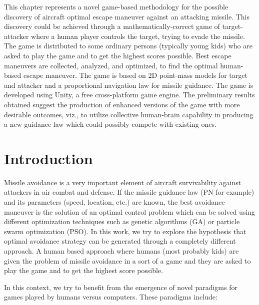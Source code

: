 \label{game}

This chapter represents a novel game-based methodology for the possible discovery of aircraft optimal escape maneuver against an attacking missile. This discovery could be achieved through a mathematically-correct game of target-attacker where a human player controls the target, trying to evade the missile.  The game is distributed to some ordinary persons (typically young kids) who are asked to play the game and to get the highest scores possible. Best escape maneuvers are collected, analyzed, and optimized, to find the optimal human-based escape maneuver. The game is based on 2D point-mass models for target and attacker and a proportional navigation law for missile guidance. The game is developed using Unity, a free cross-platform game engine. The preliminary results obtained suggest the production of enhanced versions of the game with more desirable outcomes, viz., to utilize collective human-brain capability in producing a new guidance law which could possibly compete with existing ones.

\section{Introduction}

Missile avoidance is a very important element of aircraft survivability against attackers in air combat and defense. If the missile guidance law (PN for example) and its parameters (speed, location, etc.) are known, the best avoidance maneuver is the solution of an optimal control problem which can be solved using different optimization techniques such as genetic algorithms (GA) or particle swarm optimization (PSO).  In this work, we try to explore the hypothesis that optimal avoidance strategy can be generated through a completely different approach. A human based approach where humans (most probably kids) are given the problem of missile avoidance in a sort of a game and they are asked to play the game and to get the highest score possible.

In this context, we try to benefit from the emergence of novel paradigms for games played by humans versus computers. These paradigms include:

